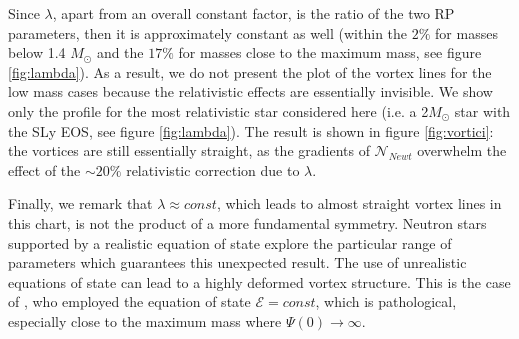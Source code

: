 \documentclass[usenatbib%
]{mnras}
\begin{document}
Since $\lambda$, apart from an overall constant factor, is the ratio of the two RP parameters, then it is approximately constant as well (within the $2\%$ for masses below 1.4 $M_\odot$ and the $17\%$ for masses close to the maximum mass, see figure \ref{fig:lambda}). 
%
%
As a result, we do not present the plot of the vortex lines for the low mass cases because the relativistic effects are essentially invisible. We show only the profile for the most relativistic star considered here (i.e. a  2$M_\odot$ star with the SLy EOS, see figure \ref{fig:lambda}). The result is shown in figure \ref{fig:vortici}: the vortices are still essentially straight, as the gradients of $\mathcal{N}_{Newt}$ overwhelm the effect of the $\sim 20\%$ relativistic correction  due to  $\lambda$.

Finally, we remark that $\lambda \approx const$, which leads to almost straight vortex lines in this chart, is not the product of a more fundamental symmetry. Neutron stars supported by a realistic equation of state explore the particular range of parameters which guarantees this unexpected result. The use of unrealistic equations of state can lead to a highly deformed vortex structure. This is the case of  \cite{Rothen1981}, who employed the equation of state $\mathcal{E}=const$, which is pathological, especially close to the maximum mass where $\Psi(0)\longrightarrow \infty$.
\end{document}
